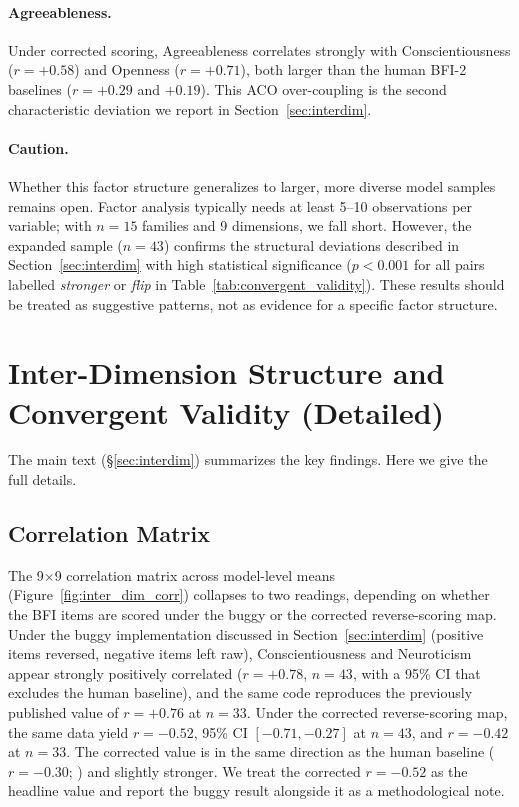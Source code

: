 \documentclass[11pt]{article}
\begin{document}
\paragraph{Agreeableness.}
Under corrected scoring, Agreeableness correlates strongly with Conscientiousness ($r = +0.58$) and Openness ($r = +0.71$), both larger than the human BFI-2 baselines ($r = +0.29$ and $+0.19$).
This ACO over-coupling is the second characteristic deviation we report in Section~\ref{sec:interdim}.

\paragraph{Caution.}
Whether this factor structure generalizes to larger, more diverse model samples remains open.
Factor analysis typically needs at least 5--10 observations per variable; with $n = 15$ families and 9 dimensions, we fall short.
However, the expanded sample ($n = 43$) confirms the structural deviations described in Section~\ref{sec:interdim} with high statistical significance ($p < 0.001$ for all pairs labelled \emph{stronger} or \emph{flip} in Table~\ref{tab:convergent_validity}).
These results should be treated as suggestive patterns, not as evidence for a specific factor structure.

\section{Inter-Dimension Structure and Convergent Validity (Detailed)}
\label{sec:appendix_structure}

The main text (\S\ref{sec:interdim}) summarizes the key findings. Here we give the full details.

\subsection{Correlation Matrix}
The 9$\times$9 correlation matrix across model-level means (Figure~\ref{fig:inter_dim_corr}) collapses to two readings, depending on whether the BFI items are scored under the buggy or the corrected reverse-scoring map.
Under the buggy implementation discussed in Section~\ref{sec:interdim} (positive items reversed, negative items left raw), Conscientiousness and Neuroticism appear strongly positively correlated ($r = +0.78$, $n = 43$, with a 95\% CI that excludes the human baseline), and the same code reproduces the previously published value of $r = +0.76$ at $n = 33$.
Under the corrected reverse-scoring map, the same data yield $r = -0.52$, 95\% CI $[-0.71, -0.27]$ at $n = 43$, and $r = -0.42$ at $n = 33$.
The corrected value is in the same direction as the human baseline ($r = -0.30$; \citealp{soto2017bfi2}) and slightly stronger.
We treat the corrected $r = -0.52$ as the headline value and report the buggy result alongside it as a methodological note.
\end{document}
